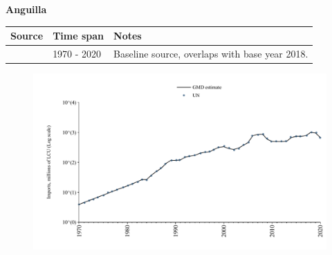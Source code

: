 \documentclass[12pt,a4paper,landscape]{article}
\begin{document}
\begin{adjustbox}{max totalsize={\paperwidth}{\paperheight},center}
\begin{minipage}[t][\textheight][t]{\textwidth}
\vspace*{0.5cm}
{}
\begin{center}
{\Large\bfseries Anguilla}
\end{center}
\vspace{0.5cm}
\begin{table}[H]
\centering
\small
\begin{tabular}{|l|l|l|}
\hline
\textbf{Source} & \textbf{Time span} & \textbf{Notes} \\
\hline
\rowcolor{white}\cite{UN}& 1970 - 2020 &Baseline source, overlaps with base year 2018.\\
\hline
\end{tabular}
\end{table}
\begin{figure}[H]
\centering
\includegraphics[width=\textwidth,height=0.6\textheight,keepaspectratio]{graphs/AIA_imports.pdf}
\end{figure}
\end{minipage}
\end{adjustbox}
\end{document}
